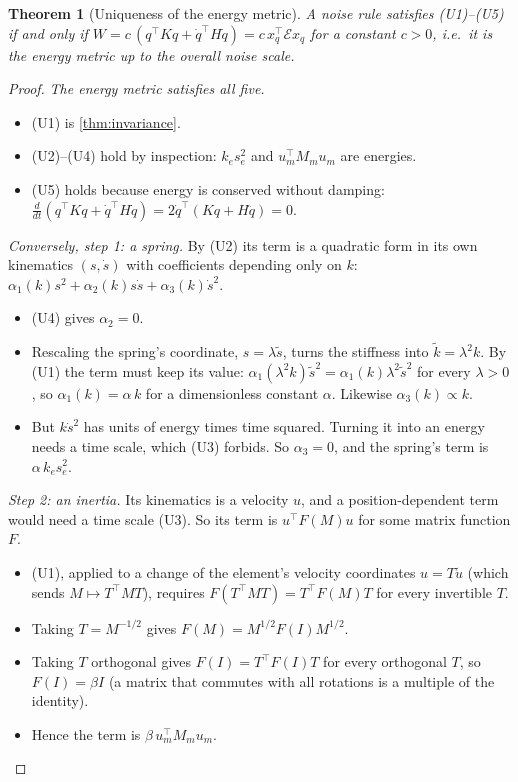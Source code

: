 \documentclass[11pt]{article}
\newtheorem{theorem}{Theorem}
\theoremstyle{definition}
\theoremstyle{remark}
\newcommand{\Em}{\mathcal{E}}         %
\begin{document}
\begin{theorem}[Uniqueness of the energy metric]\label{thm:unique}
A noise rule satisfies (U1)--(U5) if and only if
$W=c\,(q^\top Kq+\dot q^\top H\dot q)=c\,x_q^\top\Em x_q$ for a constant $c>0$, i.e.\ it is
the energy metric up to the overall noise scale.
\end{theorem}
\begin{proof}
\emph{The energy metric satisfies all five.}
\begin{itemize}[nosep]
  \item (U1) is \cref{thm:invariance}.
  \item (U2)--(U4) hold by inspection: $k_es_e^2$ and $u_m^\top M_mu_m$ are energies.
  \item (U5) holds because energy is conserved without damping:
        $\frac{d}{dt}(q^\top Kq+\dot q^\top H\dot q)=2\dot q^\top(Kq+H\ddot q)=0$.
\end{itemize}

\emph{Conversely, step 1: a spring.} By (U2) its term is a quadratic form in its own
kinematics $(s,\dot s)$ with coefficients depending only on $k$:
$\alpha_1(k)s^2+\alpha_2(k)s\dot s+\alpha_3(k)\dot s^2$.
\begin{itemize}[nosep]
  \item (U4) gives $\alpha_2=0$.
  \item Rescaling the spring's coordinate, $s=\lambda\tilde s$, turns the stiffness into
        $\tilde k=\lambda^2k$. By (U1) the term must keep its value:
        $\alpha_1(\lambda^2k)\tilde s^2=\alpha_1(k)\lambda^2\tilde s^2$ for every
        $\lambda>0$, so $\alpha_1(k)=\alpha\,k$ for a dimensionless constant $\alpha$.
        Likewise $\alpha_3(k)\propto k$.
  \item But $k\dot s^2$ has units of energy times time squared. Turning it into an energy
        needs a time scale, which (U3) forbids. So $\alpha_3=0$, and the spring's term is
        $\alpha\,k_es_e^2$.
\end{itemize}

\emph{Step 2: an inertia.} Its kinematics is a velocity $u$, and a position-dependent term
would need a time scale (U3). So its term is $u^\top F(M)u$ for some matrix function $F$.
\begin{itemize}[nosep]
  \item (U1), applied to a change of the element's velocity coordinates $u=T\tilde u$
        (which sends $M\mapsto T^\top MT$), requires $F(T^\top MT)=T^\top F(M)T$ for every
        invertible $T$.
  \item Taking $T=M^{-1/2}$ gives $F(M)=M^{1/2}F(I)M^{1/2}$.
  \item Taking $T$ orthogonal gives $F(I)=T^\top F(I)T$ for every orthogonal $T$, so
        $F(I)=\beta I$ (a matrix that commutes with all rotations is a multiple of the
        identity).
  \item Hence the term is $\beta\,u_m^\top M_mu_m$.
\end{itemize}


\end{proof}
\end{document}
